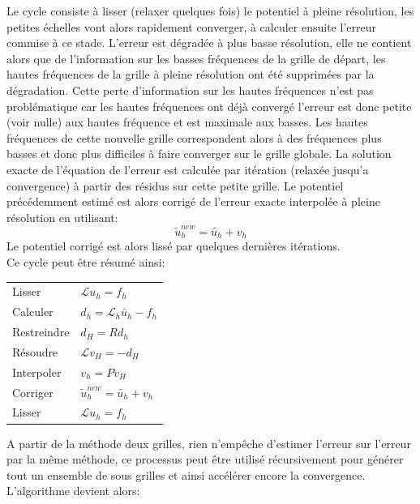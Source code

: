Le cycle consiste à lisser (relaxer quelques fois) le potentiel à pleine résolution, les petites échelles vont alors rapidement converger, à calculer ensuite l'erreur commise à ce stade. L'erreur est dégradée à plus basse résolution, elle ne contient alors que de l'information sur les basses fréquences de la grille de départ, les hautes fréquences de la grille à pleine résolution ont été supprimées par la dégradation. Cette perte d'information sur les hautes fréquences n'est pas problématique car les hautes fréquences ont déjà convergé l'erreur est donc petite (voir nulle) aux hautes fréquence et est maximale aux basses. Les hautes fréquences de cette nouvelle grille correspondent alors à des fréquences plus basses et donc plus difficiles à faire converger sur le grille globale. La solution exacte de l'équation de l'erreur est calculée par itération (relaxée jusqu'a convergence) à partir des résidus sur cette petite grille. Le potentiel précédemment estimé est alors corrigé de l'erreur exacte interpolée à pleine résolution en utilisant:
\[ \tilde{u}_h^{new} = \tilde{u_h} + v_h \]
Le potentiel corrigé est alors lissé par quelques dernières itérations.\\

Ce cycle peut être résumé ainsi:


\begin{tabular}{ll}
Lisser 		& 	$ \mathcal{L} u_h = f_h $\\
Calculer	&	$ d_h = \mathcal{L}_h \tilde{u_h} - f_h $\\
Restreindre	&	$ d_H = Rd_h$\\
Résoudre	&	$ \mathcal{L} v_H = -d_H $\\
Interpoler	&	$ v_h = Pv_H$\\
Corriger	&	$ \tilde{u}_h^{new} = \tilde{u_h} + v_h$\\
Lisser		&	$ \mathcal{L} u_h = f_h $
\end{tabular} 



A partir de la méthode deux grilles, rien n'empêche d'estimer l'erreur sur l'erreur par la même méthode, ce processus peut être utilisé récursivement pour générer tout un ensemble de sous grilles et ainsi accélérer encore la convergence.\\

L'algorithme devient alors:\\

